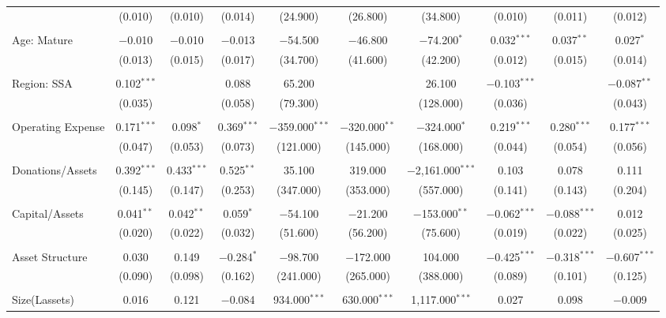 \documentclass[a4paper,nobind]{templates/ociamthesis}
\begin{document}
\begin{landscape}
\begin{table}[!htbp]
\begin{tabular}{@{\extracolsep{5pt}}lccccccccc}
  & (0.010) & (0.010) & (0.014) & (24.900) & (26.800) & (34.800) & (0.010) & (0.011) & (0.012) \\ 
  & & & & & & & & & \\ 
 Age: Mature & $-$0.010 & $-$0.010 & $-$0.013 & $-$54.500 & $-$46.800 & $-$74.200$^{*}$ & 0.032$^{***}$ & 0.037$^{**}$ & 0.027$^{*}$ \\ 
  & (0.013) & (0.015) & (0.017) & (34.700) & (41.600) & (42.200) & (0.012) & (0.015) & (0.014) \\ 
  & & & & & & & & & \\ 
 Region: SSA & 0.102$^{***}$ &  & 0.088 & 65.200 &  & 26.100 & $-$0.103$^{***}$ &  & $-$0.087$^{**}$ \\ 
  & (0.035) &  & (0.058) & (79.300) &  & (128.000) & (0.036) &  & (0.043) \\ 
  & & & & & & & & & \\ 
 Operating Expense & 0.171$^{***}$ & 0.098$^{*}$ & 0.369$^{***}$ & $-$359.000$^{***}$ & $-$320.000$^{**}$ & $-$324.000$^{*}$ & 0.219$^{***}$ & 0.280$^{***}$ & 0.177$^{***}$ \\ 
  & (0.047) & (0.053) & (0.073) & (121.000) & (145.000) & (168.000) & (0.044) & (0.054) & (0.056) \\ 
  & & & & & & & & & \\ 
 Donations/Assets & 0.392$^{***}$ & 0.433$^{***}$ & 0.525$^{**}$ & 35.100 & 319.000 & $-$2,161.000$^{***}$ & 0.103 & 0.078 & 0.111 \\ 
  & (0.145) & (0.147) & (0.253) & (347.000) & (353.000) & (557.000) & (0.141) & (0.143) & (0.204) \\ 
  & & & & & & & & & \\ 
 Capital/Assets & 0.041$^{**}$ & 0.042$^{**}$ & 0.059$^{*}$ & $-$54.100 & $-$21.200 & $-$153.000$^{**}$ & $-$0.062$^{***}$ & $-$0.088$^{***}$ & 0.012 \\ 
  & (0.020) & (0.022) & (0.032) & (51.600) & (56.200) & (75.600) & (0.019) & (0.022) & (0.025) \\ 
  & & & & & & & & & \\ 
 Asset Structure & 0.030 & 0.149 & $-$0.284$^{*}$ & $-$98.700 & $-$172.000 & 104.000 & $-$0.425$^{***}$ & $-$0.318$^{***}$ & $-$0.607$^{***}$ \\ 
  & (0.090) & (0.098) & (0.162) & (241.000) & (265.000) & (388.000) & (0.089) & (0.101) & (0.125) \\ 
  & & & & & & & & & \\ 
 Size(Lassets) & 0.016 & 0.121 & $-$0.084 & 934.000$^{***}$ & 630.000$^{***}$ & 1,117.000$^{***}$ & 0.027 & 0.098 & $-$0.009 \\ 

\end{tabular}
\end{table}
\end{landscape}
\end{document}
